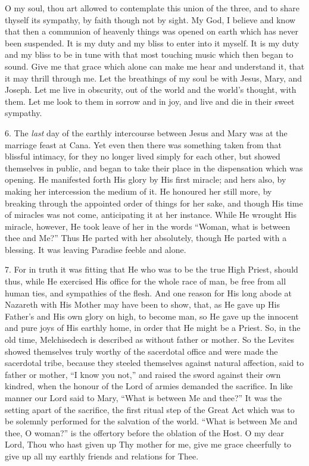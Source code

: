 O my soul, thou art allowed to
contemplate this union of the three, and to share thyself its sympathy,
by faith though not by sight. My God, I believe and know that then
a communion of heavenly things was opened on earth which has never been
suspended. It is my duty and my bliss to enter into it myself. It is my
duty and my bliss to be in tune with that most touching music which then
began to sound. Give me that grace which alone can make me hear and
understand it, that it may thrill through me. Let the breathings of my
soul be with Jesus, Mary, and Joseph. Let me live in obscurity, out of
the world and the world's thought, with them. Let me look to them in
sorrow and in joy, and live and die in their sweet sympathy.

6. The \emph{last} day of the
earthly intercourse between Jesus and Mary was at the marriage feast at
Cana. Yet even then there was something taken from that blissful
intimacy, for they no longer lived simply for each other, but showed
themselves in public, and began to take their place in the dispensation
which was opening. He manifested forth His glory by His first miracle;
and hers also, by making her intercession the medium of it. He honoured
her still more, by breaking through the appointed order of things for
her sake, and though His time of miracles was not come, anticipating it
at her instance. While He wrought His miracle, however, He took leave of
her in the words ``Woman, what is between thee and Me?'' Thus He parted
with her absolutely, though He parted with a blessing. It was leaving
Paradise feeble and alone.

7. For in truth it was fitting
that He who was to be the true High Priest, should thus, while He
exercised His office for the whole race of man, be free from all
human ties, and sympathies of the flesh. And one reason for His long
abode at Nazareth with His Mother may have been to show, that, as He
gave up His Father's and His own glory on high, to become man, so He
gave up the innocent and pure joys of His earthly home, in order that He
might be a Priest. So, in the old time, Melchisedech is described as
without father or mother. So the Levites showed themselves truly worthy
of the sacerdotal office and were made the sacerdotal tribe, because
they steeled themselves against natural affection, said to father or
mother, ``I know you not,'' and raised the sword against their own
kindred, when the honour of the Lord of armies demanded the sacrifice.
In like manner our Lord said to Mary, ``What is between Me and thee?'' It
was the setting apart of the sacrifice, the first ritual step of the
Great Act which was to be solemnly performed for the salvation of the
world. ``What is between Me and thee, O woman?'' is the offertory before
the oblation of the Host. O my dear Lord, Thou who hast given up Thy
mother for me, give me grace cheerfully to give up all my earthly
friends and relations for Thee.

